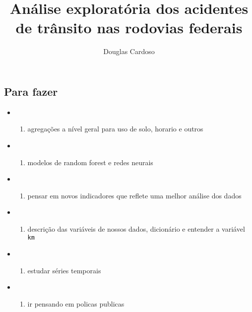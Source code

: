\documentclass[
]{article}
\title{Análise exploratória dos acidentes de trânsito nas rodovias
federais}
\author{Douglas Cardoso}
\date{}
\providecommand{\tightlist}{%
  \setlength{\itemsep}{0pt}\setlength{\parskip}{0pt}}
\begin{document}
\maketitle

\hypertarget{para-fazer}{%
\subsection{Para fazer}\label{para-fazer}}

\begin{itemize}
\item
  \begin{enumerate}
  \def\labelenumi{\arabic{enumi}.}
  \tightlist
  \item
    agregações a nível geral para uso de solo, horario e outros
  \end{enumerate}
\item
  \begin{enumerate}
  \def\labelenumi{\arabic{enumi}.}
  \setcounter{enumi}{1}
  \tightlist
  \item
    modelos de random forest e redes neurais
  \end{enumerate}
\item
  \begin{enumerate}
  \def\labelenumi{\arabic{enumi}.}
  \setcounter{enumi}{2}
  \tightlist
  \item
    pensar em novos indicadores que reflete uma melhor análise dos dados
  \end{enumerate}
\item
  \begin{enumerate}
  \def\labelenumi{\arabic{enumi}.}
  \setcounter{enumi}{3}
  \tightlist
  \item
    descrição das variáveis de nossos dados, dicionário e entender a
    variável \texttt{km}
  \end{enumerate}
\item
  \begin{enumerate}
  \def\labelenumi{\arabic{enumi}.}
  \setcounter{enumi}{4}
  \tightlist
  \item
    estudar séries temporais
  \end{enumerate}
\item
  \begin{enumerate}
  \def\labelenumi{\arabic{enumi}.}
  \setcounter{enumi}{5}
  \tightlist
  \item
    ir pensando em policas publicas
  \end{enumerate}
\end{itemize}
\end{document}
